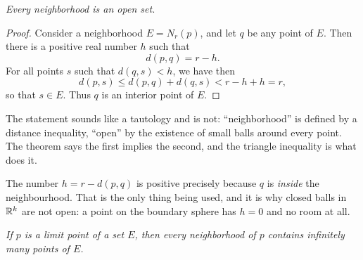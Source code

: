 \emph{Every neighborhood is an open set.}

\begin{proof}
Consider a neighborhood $E = N_r(p)$, and let $q$ be any point of $E$. Then
there is a positive real number $h$ such that
\[ d(p,q) = r - h. \]
For all points $s$ such that $d(q,s) < h$, we have then
\[ d(p,s) \le d(p,q) + d(q,s) < r - h + h = r, \]
so that $s \in E$. Thus $q$ is an interior point of $E$.
\end{proof}

\begin{unpack}
The statement sounds like a tautology and is not: ``neighborhood'' is defined
by a distance inequality, ``open'' by the existence of small balls around every
point. The theorem says the first implies the second, and the triangle
inequality is what does it.

\medskip
\begin{center}
\end{center}

\smallskip
The number $h = r - d(p,q)$ is positive precisely because $q$ is \emph{inside}
the neighbourhood. That is the only thing being used, and it is why closed
balls in $\mathbb{R}^k$ are not open: a point on the boundary sphere has $h = 0$ and
no room at all.
\end{unpack}

\emph{If $p$ is a limit point of a set $E$, then every neighborhood of $p$
contains infinitely many points of $E$.}

